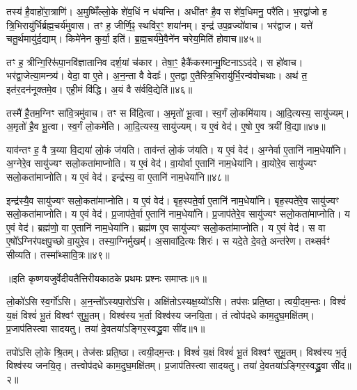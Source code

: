    तस्य॑ है॒वाहो॑रा॒त्राणि॑।
   अ॒मुष्मिँ॑ल्लो॒के शे॑व॒धिं न ध॑यन्ति।
   अधी॑तꣳ है॒व स शे॑व॒धिमनु॒ परै॑ति।
   भ॒रद्वा॑जो ह त्रि॒भिरायु॑र्भिर्ब्रह्म॒चर्य॑मुवास।
   तꣳ ह॒ जीर्णि॒ꣴ॒ स्थवि॑र॒ꣳ॒ शया॑नम्।
   इन्द्र॑ उप॒व्रज्यो॑वाच।
   भर॑द्वाज।
   यत्ते॑ चतु॒र्थमायु॑र्द॒द्याम्।
   किमे॑नेन कुर्या॒ इति॑।
   ब्र॒ह्म॒चर्य॑मे॒वैने॑न चरेय॒मिति॑ होवाच॥४५॥

   तꣳ ह॒ त्रीन्गि॒रिरू॑पा॒नवि॑ज्ञातानिव दर्\mbox{}श॒यां च॑कार।
   तेषा॒ꣳ॒ हैकै॑कस्मान्मु॒ष्टिनाऽऽद॑दे।
   स हो॑वाच।
   भर॑द्वा॒जेत्या॒मन्त्र्य॑।
   वेदा॒ वा ए॒ते।
   अ॒न॒न्ता वै वेदाः᳚।
   ए॒तद्वा ए॒तैस्त्रि॒भिरायु॑र्भि॒रन्व॑\-वोचथाः।
   अथ॑ त॒ इत॑र॒दन॑नूक्तमे॒व।
   एही॒मं वि॑द्धि।
   अ॒यं वै स॑र्ववि॒द्येति॑॥४६॥

   तस्मै॑ है॒तम॒ग्निꣳ सा॑वि॒त्रमु॑वाच।
   तꣳ स वि॑दि॒त्वा।
   अ॒मृतो॑ भू॒त्वा।
   स्व॒र्गं लो॒कमि॑याय।
   आ॒दि॒त्यस्य॒ सायु॑ज्यम्।
   अ॒मृतो॑ है॒व भू॒त्वा।
   स्व॒र्गं लो॒कमे॑ति।
   आ॒दि॒त्यस्य॒ सायु॑ज्यम्।
   य ए॒वं वेद॑।
   ए॒षो ए॒व त्रयी॑ वि॒द्या॥४७॥

   याव॑न्तꣳ ह॒ वै त्र॒य्या वि॒द्यया॑ लो॒कं ज॑यति।
   ताव॑न्तं लो॒कं ज॑यति।
   य ए॒वं वेद॑।
   अ॒ग्नेर्वा ए॒तानि॑ नाम॒धेया॑नि।
   अ॒ग्नेरे॒व सायु॑ज्यꣳ सलो॒कता॑माप्नोति।
   य ए॒वं वेद॑।
   वा॒योर्वा ए॒तानि॑ नाम॒धेया॑नि।
   वा॒योरे॒व सायु॑ज्यꣳ सलो॒कता॑माप्नोति।
   य ए॒वं वेद॑।
   इन्द्र॑स्य॒ वा ए॒तानि॑ नाम॒धेया॑नि॥४८॥

   इन्द्र॑स्यै॒व सायु॑ज्यꣳ सलो॒कता॑माप्नोति।
   य ए॒वं वेद॑।
   बृह॒स्पते॒र्वा ए॒तानि॑ नाम॒धेया॑नि।
   बृह॒स्पते॑रे॒व सायु॑ज्यꣳ सलो॒कता॑माप्नोति।
   य ए॒वं वेद॑।
   प्र॒जाप॑ते॒र्वा ए॒तानि॑ नाम॒धेया॑नि।
   प्र॒जाप॑तेरे॒व सायु॑ज्यꣳ सलो॒कता॑माप्नोति।
   य ए॒वं वेद॑।
   ब्रह्म॑णो॒ वा ए॒तानि॑ नाम॒धेया॑नि।
   ब्रह्म॑ण ए॒व सायु॑ज्यꣳ सलो॒कता॑माप्नोति।
   य ए॒वं वेद॑।
   स वा ए॒षो᳚ऽग्निर॑पक्षपु॒च्छो वा॒युरे॒व।
   तस्या॒ग्निर्मुखम्᳚।
   अ॒सावा॑दि॒त्यः शिरः॑।
   स यदे॒ते दे॒वते॒ अन्त॑रेण।
   तथ्सर्वꣳ॑ सीव्यति।
   तस्मा᳚थ्सावि॒त्रः॥४९॥
   \anuvakamend
   
॥इति कृष्णयजुर्वेदीयतैत्तिरीयकाठके प्रथमः प्रश्नः समाप्तः॥१॥

\setcounter{anuvakam}{0}

   लो॒को॑ऽसि स्व॒र्गो॑ऽसि।
   अ॒न॒न्तो᳚ऽस्यपा॒रो॑ऽसि।
   अक्षि॑तो\-ऽस्यक्ष॒य्यो॑\-ऽसि।
   तप॑सः प्रति॒ष्ठा।
   त्वयी॒दम॒न्तः।
   विश्वं॑ य॒क्षं विश्वं॑ भू॒तं विश्वꣳ॑ सुभू॒तम्।
   विश्व॑स्य भ॒र्ता विश्व॑स्य जनयि॒ता।
   तं त्वोप॑दधे काम॒दुघ॒मक्षि॑तम्।
   प्र॒जाप॑तिस्त्वा सादयतु।
   तया॑ दे॒वतया॑ऽङ्गिर॒स्वद्ध्रु॒वा सी॑द॥१॥

   तपो॑ऽसि लो॒के श्रि॒तम्।
   तेज॑सः प्रति॒ष्ठा।
   त्वयी॒दम॒न्तः।
   विश्वं॑ य॒क्षं विश्वं॑ भू॒तं विश्वꣳ॑ सुभू॒तम्।
   विश्व॑स्य भ॒र्तृ विश्व॑स्य जनयि॒तृ।
   तत्त्वोप॑दधे काम॒दुघ॒मक्षि॑तम्।
   प्र॒जाप॑तिस्त्वा सादयतु।
   तया॑ दे॒वतया॑ऽङ्गिर॒स्वद्ध्रु॒वा सी॑द॥२॥

